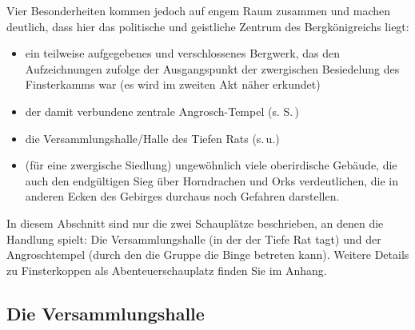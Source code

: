 \documentclass[openright]{Ilaris}
\begin{document}
Vier Besonderheiten kommen jedoch auf engem Raum zusammen und machen deutlich, dass hier das politische und geistliche Zentrum des Bergkönigreichs liegt:
\begin{itemize}
	\item ein teilweise aufgegebenes und verschlossenes Bergwerk, das den Aufzeichnungen zufolge der Ausgangspunkt der zwergischen Besiedelung des Finsterkamms war (es wird im zweiten Akt näher erkundet)
	\item der damit verbundene zentrale Angrosch-Tempel (s. S.\,\pageref{angrosch})
	\item die Versammlungshalle/Halle des Tiefen Rats (s.\,u.)
	\item (für eine zwergische Siedlung)  ungewöhnlich viele oberirdische Gebäude, die auch den endgültigen Sieg über Horndrachen und Orks verdeutlichen,
	die in anderen Ecken des Gebirges durchaus noch Gefahren darstellen.
\end{itemize}

In diesem Abschnitt sind nur die zwei Schauplätze beschrieben, an denen die Handlung spielt: Die Versammlungshalle (in der der Tiefe Rat tagt) und der Angroschtempel (durch den die Gruppe die Binge betreten kann). Weitere Details zu Finsterkoppen als Abenteuerschauplatz finden Sie im Anhang.


\subsection{Die Versammlungshalle}

\end{document}

